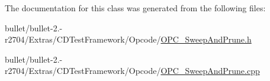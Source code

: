 The documentation for this class was generated from the following files\+:\begin{DoxyCompactItemize}
\item 
bullet/bullet-\/2.-\/r2704/\+Extras/\+C\+D\+Test\+Framework/\+Opcode/\hyperlink{_o_p_c___sweep_and_prune_8h}{O\+P\+C\+\_\+\+Sweep\+And\+Prune.\+h}\item 
bullet/bullet-\/2.-\/r2704/\+Extras/\+C\+D\+Test\+Framework/\+Opcode/\hyperlink{_o_p_c___sweep_and_prune_8cpp}{O\+P\+C\+\_\+\+Sweep\+And\+Prune.\+cpp}\end{DoxyCompactItemize}
